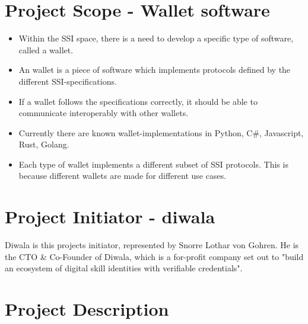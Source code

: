 \newpage



\section{Project Scope - Wallet software} 
\begin{itemize}
    \item Within the SSI space, there is a need to develop a specific type of software, called a wallet.
    \item An wallet is a piece of software which implements protocols defined by the different SSI-specifications.
    \item If a wallet follows the specifications correctly, it should be able to communicate interoperably with other wallets.
    \item Currently there are known wallet-implementations in Python, C#, Javascript, Rust, Golang.
    \item Each type of wallet implements a different subset of SSI protocols. This is because different wallets are made for different use cases.
\end{itemize}



\section{Project Initiator - \gls{diwala}}

Diwala is this projects initiator, represented by Snorre Lothar von Gohren. He is the CTO  & Co-Founder of Diwala, which is a for-profit company set out to "build an ecosystem of digital skill identities with verifiable credentials"\cite{DiwalaAbout}.



\section{Project Description}

